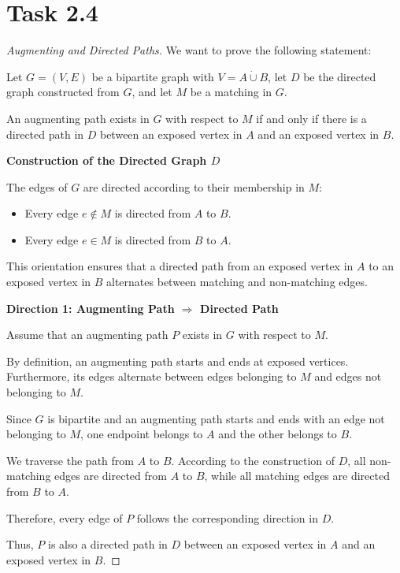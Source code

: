\documentclass{Group_Templ}
\begin{document}
\section*{Task 2.4}


\begin{proof}[Augmenting and Directed Paths]
	We want to prove the following statement:
	
	Let $G = (V, E)$ be a bipartite graph with
	$V = A \dot\cup B$, let $D$ be the directed graph
	constructed from $G$, and let $M$ be a matching in $G$.
	
	An augmenting path exists in $G$ with respect to $M$
	if and only if there is a directed path in $D$
	between an exposed vertex in $A$ and an exposed
	vertex in $B$.
	
	\medskip
	\noindent\textbf{Construction of the Directed Graph $D$}
	
	The edges of $G$ are directed according to their
	membership in $M$:
	
	\begin{itemize}
		\item Every edge $e \notin M$ is directed
		from $A$ to $B$.
		\item Every edge $e \in M$ is directed
		from $B$ to $A$.
	\end{itemize}
	
	This orientation ensures that a directed path from
	an exposed vertex in $A$ to an exposed vertex in $B$
	alternates between matching and non-matching edges.
	
	\medskip
	\noindent\textbf{Direction 1:
		Augmenting Path $\Rightarrow$ Directed Path}
	
	Assume that an augmenting path $P$ exists in $G$
	with respect to $M$.
	
	By definition, an augmenting path starts and ends
	at exposed vertices. Furthermore, its edges alternate
	between edges belonging to $M$ and edges not
	belonging to $M$.
	
	Since $G$ is bipartite and an augmenting path starts
	and ends with an edge not belonging to $M$, one
	endpoint belongs to $A$ and the other belongs to $B$.
	
	We traverse the path from $A$ to $B$. According to
	the construction of $D$, all non-matching edges are
	directed from $A$ to $B$, while all matching edges
	are directed from $B$ to $A$.
	
	Therefore, every edge of $P$ follows the
	corresponding direction in $D$.
	
	Thus, $P$ is also a directed path in $D$ between
	an exposed vertex in $A$ and an exposed vertex
	in $B$.
	

\end{proof}
\end{document}
